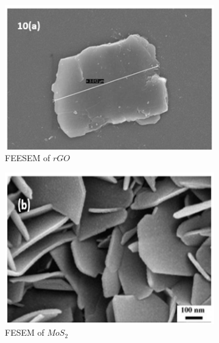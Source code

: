 \documentclass[11pt,a5paper]{article}
\begin{document}
\begin{figure}[t]
    \centering
    \begin{subfigure}[b]{0.325\textwidth}
        \centering
        \includegraphics[width=\linewidth]{fesem_rGO.png}
        \caption{FEESEM of $rGO$}
    \end{subfigure}
    \hfill
    \begin{subfigure}[b]{0.325\textwidth}
        \centering
        \includegraphics[width=\linewidth]{fesem_MoS2.png}
        \caption{FESEM of $MoS_{2}$}
    \end{subfigure}
    \hfill
    \begin{subfigure}[b]{0.325\textwidth}
        \centering

\end{subfigure}
\end{figure}
\end{document}
